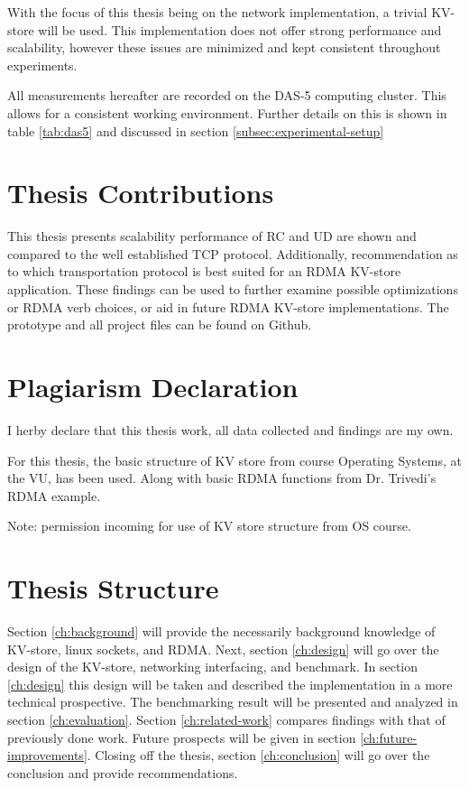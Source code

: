 With the focus of this thesis being on the network implementation, a trivial KV-store will be used.
This implementation does not offer strong performance and scalability, however these issues are minimized and kept consistent throughout experiments.

All measurements hereafter are recorded on the DAS-5 computing cluster.
This allows for a consistent working environment.
Further details on this is shown in table \ref{tab:das5} and discussed in section \ref{subsec:experimental-setup}

\section{Thesis Contributions}
This thesis presents scalability performance of RC and UD are shown and compared to the well established TCP protocol.
Additionally, recommendation as to which transportation protocol is best suited for an RDMA KV-store application.
These findings can be used to further examine possible optimizations or RDMA verb choices, or aid in future RDMA KV-store implementations.
The prototype and all project files can be found on Github\cite{github}.

\section{Plagiarism Declaration}
I herby declare that this thesis work, all data collected and findings are my own.

For this thesis, the basic structure of KV store from course Operating Systems, at the VU, has been used.
Along with basic RDMA functions from Dr. Trivedi's RDMA example\cite{rdma_example}.

Note: permission incoming for use of KV store structure from OS course.

\section{Thesis Structure}
Section \ref{ch:background} will provide the necessarily background knowledge of KV-store, linux sockets, and RDMA.
Next, section \ref{ch:design} will go over the design of the KV-store, networking interfacing, and benchmark.
In section \ref{ch:design} this design will be taken and described the implementation in a more technical prospective.
The benchmarking result will be presented and analyzed in section \ref{ch:evaluation}.
Section \ref{ch:related-work} compares findings with that of previously done work.
Future prospects will be given in section \ref{ch:future-improvements}.
Closing off the thesis, section \ref{ch:conclusion} will go over the conclusion and provide recommendations.